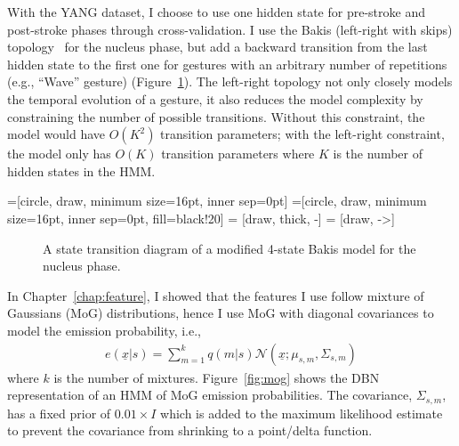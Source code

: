 With the YANG dataset, I choose to use one hidden state for pre-stroke and
post-stroke phases through cross-validation. I use the Bakis (left-right with
skips) topology~\cite{Bauer00} for the nucleus phase, but add a backward
transition from the last hidden state to the first one for gestures with an arbitrary number of repetitions (e.g., ``Wave''
gesture) (Figure~\ref{fig:bakis}). The left-right topology not only closely
models the temporal evolution of a gesture, it also reduces the model complexity
by constraining the number of possible transitions. Without this constraint,
the model would have $O(K^2)$ transition parameters; with the left-right
constraint, the model only has $O(K)$ transition parameters where $K$ is the
number of hidden states in the HMM.

=[circle, draw, minimum size=16pt, inner sep=0pt]
=[circle, draw, minimum size=16pt, inner
sep=0pt, fill=black!20] 
 = [draw, thick, -]
 = [draw, ->]
\begin{figure}[tbh]
\centering
  \caption{A state transition diagram of a modified 4-state Bakis model for the nucleus phase.}
  \label{fig:bakis}
\end{figure}

In Chapter~\ref{chap:feature}, I showed that the features I use follow mixture
of Gaussians (MoG) distributions, hence I use MoG with diagonal covariances to
model the emission probability, i.e.,
\begin{align}
e(\underline{x} | s) = \sum_{m=1}^k q(m | s)\mathcal{N}(\underline{x};
\mu_{s,m}, \Sigma_{s, m})
\end{align}
where $k$ is the number of mixtures.
Figure~\ref{fig:mog} shows the DBN representation of an HMM of MoG emission
probabilities. The covariance, $\Sigma_{s, m}$, has a fixed prior of $0.01\times
I$ which is added to the maximum likelihood estimate to prevent the covariance from shrinking to a point/delta function. 

